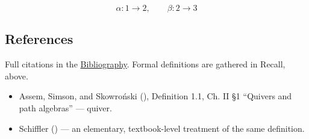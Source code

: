 \[
\alpha : 1 \to 2, \qquad \beta : 2 \to 3
\]

\subsection{References}\label{sec:11-path-algebras:01-what-is-a-quiver:3}

Full citations in the \hyperref[sec:root:bibliography:1]{Bibliography}. Formal definitions are gathered in Recall, above.

\begin{itemize}
\tightlist
\item
  Assem, Simson, and Skowroński (\cite{AssemSimsonSkowronski2006}), Definition 1.1, Ch. II §1 ``Quivers and path algebras'' --- quiver.
\item
  Schiffler (\cite{Schiffler2014}) --- an elementary, textbook-level treatment of the same definition.
\end{itemize}
